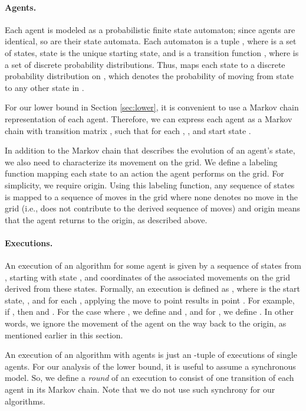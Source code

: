 \documentclass[11pt]{article}
\begin{document}
\paragraph{Agents.}
Each agent is modeled as a probabilistic finite state automaton; since agents are identical, so are their state automata. Each automaton is a tuple , where  is a set of states, state  is the unique starting state, and  is a transition function  , where  is a set of discrete probability distributions. Thus,  maps each state  to a discrete probability distribution  on , which denotes the probability of moving from state  to any other state in . 

For our lower bound in Section \ref{sec:lower}, it is convenient to use a Markov chain representation of each agent. Therefore, we can express each agent as a Markov chain with transition matrix , such that for each , , and start state . 

In addition to the Markov chain that describes the evolution of an agent's state, we also need to characterize its movement on the grid. We define a  labeling function  mapping each state  to an action the agent performs on the grid. For simplicity, we require origin. Using this labeling function, any sequence of states  is mapped to a sequence of moves in the grid  where none denotes no move in the grid (i.e.,  does not contribute to the derived sequence of moves) and origin means that the agent returns to the origin, as described above. 

\paragraph{Executions.}
An execution of an algorithm for some agent is given by a sequence of states from , starting with state , and coordinates of the associated movements on the grid derived from these states. Formally, an execution is defined as , where  is the start state, , and for each , applying the move  to point  results in point . For example, if , then  and . For the case where , we define  and , and for , we define . In other words, we ignore the movement of the agent on the way back to the origin, as mentioned earlier in this section. 

An execution of an algorithm with  agents is just an -tuple of executions of single agents. For our analysis of the lower bound, it is useful to assume a synchronous model. So, we define a \emph{round} of an execution to consist of one transition of each agent in its Markov chain. Note that we do not use such synchrony for our algorithms.
\end{document}
